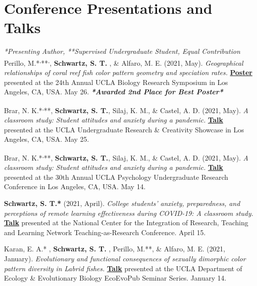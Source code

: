 \section*{Conference Presentations and Talks}
\textit{*Presenting Author, **Supervised Undergraduate Student, \dag{} Equal Contribution}\\

Perillo, M.*\textsuperscript{,}**\textsuperscript{,}\dag, \textbf{Schwartz, S. T. \dag}, \& Alfaro, M. E. (2021, May). \textit{Geographical relationships of coral reef fish color pattern geometry and speciation rates.} \textbf{\underline{Poster}} presented at the 24th Annual UCLA Biology Research Symposium in Los Angeles, CA, USA. May 26. \textbf{\textit{*Awarded 2nd Place for Best Poster*}}

\pubspace

Brar, N. K.*\textsuperscript{,}**, \textbf{Schwartz, S. T.}, Silaj, K. M., \& Castel, A. D. (2021, May). \textit{A classroom study: Student attitudes and anxiety during a pandemic.} \textbf{\underline{Talk}} presented at the UCLA Undergraduate Research \& Creativity Showcase in Los Angeles, CA, USA. May 25.

\pubspace

Brar, N. K.*\textsuperscript{,}**, \textbf{Schwartz, S. T.}, Silaj, K. M., \& Castel, A. D. (2021, May). \textit{A classroom study: Student attitudes and anxiety during a pandemic.} \textbf{\underline{Talk}} presented at the 30th Annual UCLA Psychology Undergraduate Research Conference in Los Angeles, CA, USA. May 14.

\pubspace

\textbf{Schwartz, S. T.*} (2021, April). \textit{College students’ anxiety, preparedness, and perceptions of remote learning effectiveness during COVID-19: A classroom study.} \textbf{\underline{Talk}} presented at the National Center for the Integration of Research, Teaching and Learning Network Teaching-as-Research Conference. April 15.

\pubspace

Karan, E. A.* \dag, \textbf{Schwartz, S. T. \dag}, Perillo, M.**, \& Alfaro, M. E. (2021, January). \textit{Evolutionary and functional consequences of sexually dimorphic color pattern diversity in Labrid fishes.} \textbf{\underline{Talk}} presented at the UCLA Department of Ecology \& Evolutionary Biology EcoEvoPub Seminar Series. January 14.

\pubspace


